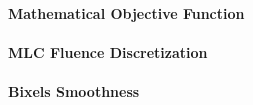 \paragraph{Mathematical Objective Function}

\paragraph{MLC Fluence Discretization}

\paragraph{Bixels Smoothness}

